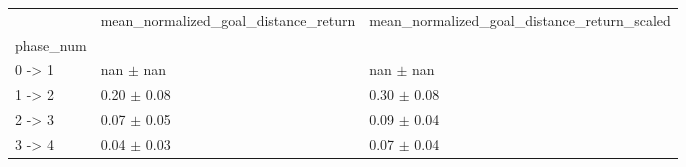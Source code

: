 \begin{tabular}{lll}
\toprule
 & mean_normalized_goal_distance_return & mean_normalized_goal_distance_return_scaled \\
phase_num &  &  \\
\midrule
0 -> 1 & nan $\pm$ nan & nan $\pm$ nan \\
1 -> 2 & 0.20 $\pm$ 0.08 & 0.30 $\pm$ 0.08 \\
2 -> 3 & 0.07 $\pm$ 0.05 & 0.09 $\pm$ 0.04 \\
3 -> 4 & 0.04 $\pm$ 0.03 & 0.07 $\pm$ 0.04 \\
\bottomrule
\end{tabular}
